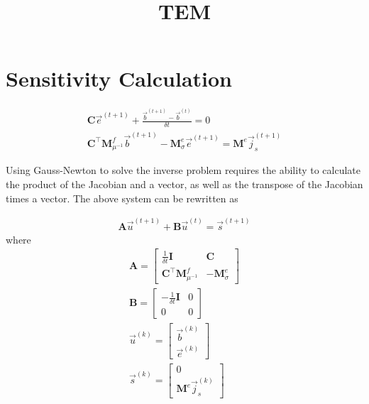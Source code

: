 \documentclass[]{article}
\newcommand{\dcurl}{{\mathbf C}}
\newcommand{\M}{{\mathbf M}}
\newcommand{\MfMui}{{\M^f_{\mu^{-1}}}}
\newcommand{\MeSig}{{\M^e_\sigma}}
\newcommand{\Me}{{\M^e}}
\newcommand{\s}{\vec{s}}
\renewcommand {\j}  { {\vec j} }
\renewcommand {\b}  { {\vec b} }
\newcommand {\e}  { {\vec e} }
\renewcommand {\u}  { {\vec u} }
\begin{document}
\title{TEM}

\section{Sensitivity Calculation}

\begin{subequations}
    \begin{align}
        \dcurl \e^{(t+1)} + \frac{\b^{(t+1)} - \b^{(t)}}{\delta t} = 0 \\
        \dcurl^\top \MfMui \b^{(t+1)} - \MeSig \e^{(t+1)} = \Me \j_s^{(t+1)}
    \end{align}
\end{subequations}

Using Gauss-Newton to solve the inverse problem requires the ability to calculate the product of the Jacobian and a vector, as well as the transpose of the Jacobian times a vector. The above system can be rewritten as

\begin{align}
    \mathbf{A} \u^{(t+1)} + \mathbf{B} \u^{(t)}= \s^{(t+1)}
\end{align}
where
\begin{subequations}
    \begin{align}
        \mathbf{A} =
        \left[
            \begin{array}{cc}
                \frac{1}{\delta t} \mathbf{I} & \dcurl \\
                \dcurl^\top \MfMui & -\MeSig
            \end{array}
        \right] \\
        \mathbf{B} =
        \left[
            \begin{array}{cc}
                -\frac{1}{\delta t} \mathbf{I} & 0 \\
                0 & 0
            \end{array}
        \right] \\
        \u^{(k)} = \left[
        \begin{array}{c}
            \b^{(k)}\\
            \e^{(k)}
        \end{array}
        \right] \\
        \s^{(k)} = \left[
        \begin{array}{c}
            0\\
            \Me \j^{(k)}_s
        \end{array}
        \right]
    \end{align}
\end{subequations}
\end{document}

